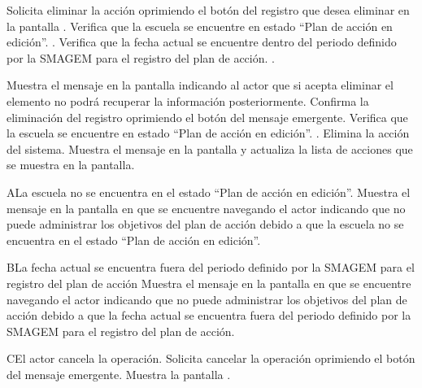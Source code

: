  \begin{UCtrayectoria}
\UCpaso[\UCactor] Solicita eliminar la acción oprimiendo el botón \botKo  del registro que desea eliminar en la pantalla .
	\UCpaso[\UCsist] Verifica que la escuela se encuentre en  estado ``Plan de acción en edición''. .
    \UCpaso[\UCsist] Verifica que la fecha actual se encuentre dentro del periodo definido por la SMAGEM para el registro del plan de acción. .

\UCpaso[\UCsist] Muestra el mensaje  en la pantalla  indicando al actor que si acepta eliminar 
el elemento no podrá recuperar la información posteriormente.
\UCpaso[\UCactor] Confirma la eliminación del registro oprimiendo el botón  del mensaje emergente. 
	\UCpaso[\UCsist] Verifica que la escuela se encuentre en  estado ``Plan de acción en edición''. .
\UCpaso[\UCsist] Elimina la acción del sistema.
\UCpaso[\UCsist] Muestra el mensaje  en la pantalla  y actualiza la lista de acciones que se muestra en la pantalla.
 \end{UCtrayectoria}

\begin{UCtrayectoriaA}{A}{La escuela no se encuentra en el estado ``Plan de acción en edición''.}
    \UCpaso[\UCsist] Muestra el mensaje  en la pantalla en que se encuentre navegando el actor indicando que no puede administrar los objetivos del plan de acción debido a que la escuela no se encuentra en el estado ``Plan de acción en edición''. 
 \end{UCtrayectoriaA}
 
   \begin{UCtrayectoriaA}{B}{La fecha actual se encuentra fuera del periodo definido por la SMAGEM para el registro del plan de acción}
    \UCpaso[\UCsist] Muestra el mensaje  en la pantalla en que se encuentre navegando el actor indicando que no puede administrar los objetivos del plan de acción debido a que la fecha actual se encuentra fuera del periodo definido por la SMAGEM para el registro del plan de acción.
 \end{UCtrayectoriaA}
 
\begin{UCtrayectoriaA}{C}{El actor cancela la operación.}
	\UCpaso[\UCactor] Solicita cancelar la operación oprimiendo el botón  del mensaje emergente.
	\UCpaso[\UCsist] Muestra la pantalla .
\end{UCtrayectoriaA}
  
